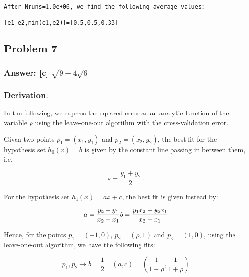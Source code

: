 \documentclass[11pt]{article}
\begin{document}
    \begin{Verbatim}[commandchars=\\\{\}]
After Nruns=1.0e+06, we find the following average values:

[e1,e2,min(e1,e2)]=[0.5,0.5,0.33]
    \end{Verbatim}

    \hypertarget{problem-7}{%
\subsection{Problem 7}\label{problem-7}}

\hypertarget{answer-c-sqrt94sqrt6}{%
\subsubsection{\texorpdfstring{Answer: {[}c{]}
\(\sqrt{9+4\sqrt{6}}\)}{Answer: {[}c{]} \textbackslash{}sqrt\{9+4\textbackslash{}sqrt\{6\}\}}}\label{answer-c-sqrt94sqrt6}}

\hypertarget{derivation}{%
\subsubsection{Derivation:}\label{derivation}}

In the following, we express the squared error as an analytic function
of the variable \(\rho\) using the leave-one-out algorithm with the
cross-validation error.

Given two points \(p_1=(x_1,y_1)\) and \(p_2=(x_2,y_2)\), the best fit
for the hypothesis set \(h_0(x)=b\) is given by the constant line
passing in between them, i.e.

\begin{equation}
b=\frac{y_1+y_2}{2}\,.
\end{equation}

For the hypothesis set \(h_1(x)=ax+c\), the best fit is given instead
by:

\begin{equation}
 a=\frac{y_2-y_1}{x_2-x_1}\\
 b=\frac{y_1 x_2-y_2 x_1}{x_2-x_1}
\end{equation}

Hence, for the points \(p_1=(-1,0)\), \(p_2=(\rho,1)\) and
\(p_3=(1,0)\), using the leave-one-out algorithm, we have the following
fits:

\begin{equation}
p_1,p_2 \rightarrow b=\frac{1}{2} \;\;\;\;  (a,c)=\left(\frac{1}{1+\rho},\frac{1}{1+\rho}\right)
\end{equation}
\end{document}
